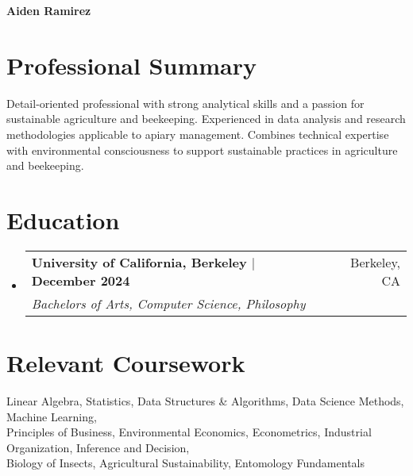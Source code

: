\documentclass[a4paper,12pt]{article}
\makeatletter
\newcommand{\resumeSubheading}[4]{
  \item[]
    \begin{tabular*}{\textwidth}{l@{\extracolsep{\fill}}r}
      \textbf{#1} & #2 \\
      \textit{#3} & \textit{#4} \\
    \end{tabular*}
}
\newcommand{\resumeSubHeadingListStart}{\begin{itemize}[leftmargin=0in]}
\newcommand{\resumeSubHeadingListEnd}{\end{itemize}}
\makeatother
\begin{document}
\begin{center}
  \textbf{{\huge Aiden Ramirez}}\\
\end{center}

\noindent{}

\vspace{0.1cm}

\section{Professional Summary}
\vspace{0.2cm}
Detail-oriented professional with strong analytical skills and a passion for sustainable agriculture and beekeeping. Experienced in data analysis and research methodologies applicable to apiary management. Combines technical expertise with environmental consciousness to support sustainable practices in agriculture and beekeeping.

\section{Education}
\resumeSubHeadingListStart
\vspace{0.2cm}
    \resumeSubheading
    {University of California, Berkeley \textnormal{$\vert$ December 2024}}{Berkeley, CA}
    {Bachelors of Arts, Computer Science, Philosophy}{}
\resumeSubHeadingListEnd

\section{Relevant Coursework}
\vspace{0.2cm}
Linear Algebra, Statistics, Data Structures \& Algorithms, Data Science Methods, Machine Learning,\\
Principles of Business, Environmental Economics, Econometrics, Industrial Organization, Inference and Decision,\\
Biology of Insects, Agricultural Sustainability, Entomology Fundamentals
\end{document}
